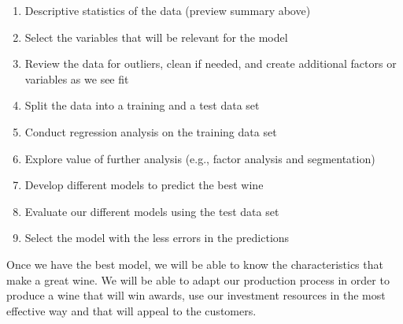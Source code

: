 \documentclass[]{article}
\providecommand{\tightlist}{%
  \setlength{\itemsep}{0pt}\setlength{\parskip}{0pt}}
\begin{document}
\begin{enumerate}
\def\labelenumi{\arabic{enumi}.}
\tightlist
\item
  Descriptive statistics of the data (preview summary above)
\item
  Select the variables that will be relevant for the model
\item
  Review the data for outliers, clean if needed, and create additional
  factors or variables as we see fit
\item
  Split the data into a training and a test data set
\item
  Conduct regression analysis on the training data set
\item
  Explore value of further analysis (e.g., factor analysis and
  segmentation)
\item
  Develop different models to predict the best wine
\item
  Evaluate our different models using the test data set
\item
  Select the model with the less errors in the predictions
\end{enumerate}

Once we have the best model, we will be able to know the characteristics
that make a great wine. We will be able to adapt our production process
in order to produce a wine that will win awards, use our investment
resources in the most effective way and that will appeal to the
customers.

\clearpage
\end{document}
